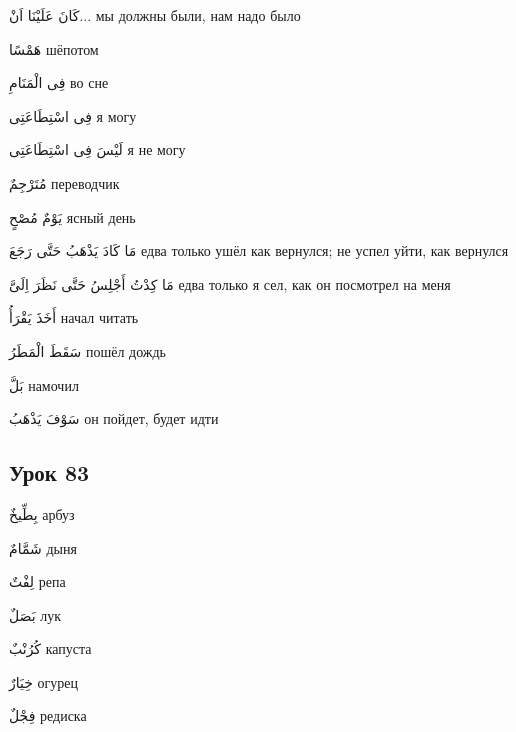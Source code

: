 \documentclass[a5paper]{article}
\newcommand\textstyleDropCaps[1]{#1}
\newcommand\textstyleCaptioncharacters[1]{#1}
\begin{document}
\textstyleCaptioncharacters{كَانَ عَلَيْنَا اَنْ...ِ }\textstyleDropCaps{мы должны были, нам надо было‎}

\textstyleCaptioncharacters{هَمْسًا }\textstyleDropCaps{шёпотом‎}

\textstyleCaptioncharacters{فِى الْمَنَامِ }\textstyleDropCaps{во сне‎}

\textstyleCaptioncharacters{فِى اسْتِطَاعَتِى }\textstyleDropCaps{я могу‎}

\textstyleCaptioncharacters{لَيْسَ فِى اسْتِطَاعَتِى }\textstyleDropCaps{я не могу‎}

\textstyleCaptioncharacters{مُتَرْجِمٌ }\textstyleDropCaps{переводчик‎}

\textstyleCaptioncharacters{يَوْمٌ مُصْحٍ }\textstyleDropCaps{ясный день‎}

\textstyleCaptioncharacters{مَا كَادَ يَذْهَبُ حَتَّى رَجَعَ }\textstyleDropCaps{едва только ушёл как вернулся; не успел уйти, как вернулся‎}

\textstyleCaptioncharacters{مَا كِدْتُ أَجْلِسُ حَتَّى نَظَرَ اِلَىَّ }\textstyleDropCaps{едва только я сел, как он посмотрел на меня‎}

\textstyleCaptioncharacters{أَخَذَ يَقْرَأُ }\textstyleDropCaps{начал читать‎}

\textstyleCaptioncharacters{سَقَطَ الْمَطَرُ }\textstyleDropCaps{пошёл дождь‎}

\textstyleCaptioncharacters{بَلَّ }\textstyleDropCaps{намочил‎}

\textstyleCaptioncharacters{سَوْفَ يَذْهَبُ }\textstyleDropCaps{он пой­дет, будет идти‎}

\subsection[Урок 83‎]{\textstyleDropCaps{Урок 83‎}}
\textstyleCaptioncharacters{بِطِّيخٌ }\textstyleDropCaps{арбуз‎}

\textstyleCaptioncharacters{شَمَّامٌ }\textstyleDropCaps{дыня‎}

\textstyleCaptioncharacters{لِفْتٌ }\textstyleDropCaps{репа‎}

\textstyleCaptioncharacters{بَصَلٌ }\textstyleDropCaps{лук‎}

\textstyleCaptioncharacters{كُرُنْبٌ }\textstyleDropCaps{капуста‎}

\textstyleCaptioncharacters{خِيَارٌ }\textstyleDropCaps{огурец‎}

\textstyleCaptioncharacters{فِجْلٌ }\textstyleDropCaps{редиска‎}
\end{document}
